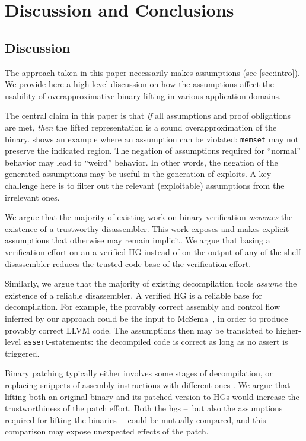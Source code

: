 \chapter{Discussion and Conclusions}


\section{Discussion}
The approach taken in this paper necessarily makes assumptions (see \cref{sec:intro}).
We provide here a high-level discussion on how the assumptions affect the usability of overapproximative binary lifting in various application domains.
\begin{description}[style=unboxed,leftmargin=0cm,noitemsep,topsep=0pt]
  \item[Security Analysis] The central claim in this paper is that \emph{if} all assumptions and  proof obligations are met, \emph{then} the lifted representation is a sound overapproximation of the binary.  shows an example where an assumption can be violated: \texttt{memset} may not preserve the indicated region.
  The negation of assumptions required for ``normal'' behavior may lead to ``weird'' behavior.
  In other words, the negation of the generated assumptions may be useful in the generation of exploits.
  A key challenge here is to filter out the relevant (exploitable) assumptions from the irrelevant ones.
  \item[Binary Verification] We argue that the majority of existing work on binary verification \emph{assumes} the existence of a trustworthy disassembler.
  This work exposes and makes explicit assumptions that otherwise may remain implicit.
  We argue that basing a verification effort on an a verified HG instead of on the output of any of-the-shelf disassembler reduces the trusted code base of the verification effort.
  \item[Decompilation] Similarly, we argue that the majority of existing decompilation tools \emph{assume} the existence of a reliable disassembler.
  A verified HG is a reliable base for decompilation.
  For example, the provably correct assembly and control flow inferred by our approach could be the input to McSema~\cite{dinaburg2014mcsema}, in order to produce provably correct LLVM code.
  The assumptions then may be translated to higher-level \texttt{assert}-statements: the decompiled code is correct as long as no assert is triggered.
  \item[Patching] Binary patching typically either involves some stages of decompilation, or replacing snippets of assembly instructions with different ones \autocite{duck2020binary}.
  We argue that lifting both an original binary and its patched version to HGs would increase the trustworthiness of the patch effort.
  Both the \acp{hg} --~but also the assumptions required for lifting the binaries~-- could be mutually compared, and this comparison may expose unexpected effects of the patch.
\end{description}


